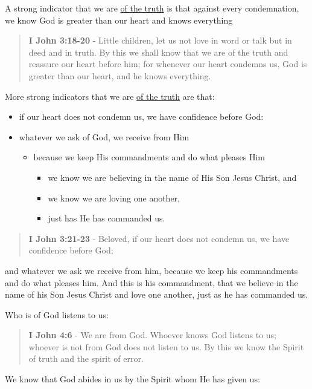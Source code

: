 \documentclass[11pt]{article}
\begin{document}
A strong indicator that we are \uline{of the truth} is that against every condemnation, we know God is greater than our heart and knows everything

\begin{quote}
\textbf{I John 3:18-20} - Little children, let us not love in word or talk but in deed and in truth. By this we shall know that we are of the truth and reassure our heart before him; for whenever our heart condemns us, God is greater than our heart, and he knows everything.
\end{quote}

More strong indicators that we are \uline{of the truth} are that:
\begin{itemize}
\item if our heart does not condemn us, we  have confidence before God:
\item whatever we ask of God, we receive from Him
\begin{itemize}
\item because we keep His commandments and do what pleases Him
\begin{itemize}
\item we know we are believing in the name of His Son Jesus Christ, and
\item we know we are loving one another,
\item just has He has commanded us.
\end{itemize}
\end{itemize}
\end{itemize}

\begin{quote}
\textbf{I John 3:21-23} - Beloved, if our heart does not condemn us, we have confidence before God;
\end{quote}
and whatever we ask we receive from him, because we keep his commandments and do what pleases him. And this is his commandment, that we believe in the name of his Son Jesus Christ and love one another, just as he has commanded us.

Who is of God listens to us:

\begin{quote}
\textbf{I John 4:6} - We are from God. Whoever knows God listens to us; whoever is not from God does not listen to us. By this we know the Spirit of truth and the spirit of error.
\end{quote}

We know that God abides in us by the Spirit whom He has given us:
\end{document}
